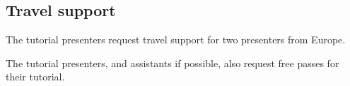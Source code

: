 \subsection*{Travel support}

The tutorial presenters request travel support for two presenters from Europe.

The tutorial presenters, and assistants if possible, also request free passes for their tutorial.

